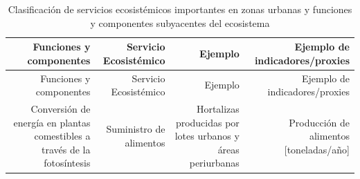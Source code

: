 \documentclass[12pt,]{book}
\begin{document}
\begin{longtable}[]{@{}rrrr@{}}
\caption{\label{tab:clasf-SerAm} Clasificación de servicios ecosistémicos
importantes en zonas urbanas y funciones y componentes subyacentes del
ecosistema}\tabularnewline
\toprule
\begin{minipage}[b]{0.26\columnwidth}\raggedleft\strut
Funciones y componentes\strut
\end{minipage} & \begin{minipage}[b]{0.22\columnwidth}\raggedleft\strut
Servicio Ecosistémico\strut
\end{minipage} & \begin{minipage}[b]{0.19\columnwidth}\raggedleft\strut
Ejemplo\strut
\end{minipage} & \begin{minipage}[b]{0.22\columnwidth}\raggedleft\strut
Ejemplo de indicadores/proxies\strut
\end{minipage}\tabularnewline
\midrule
\endfirsthead
\toprule
\begin{minipage}[b]{0.26\columnwidth}\raggedleft\strut
Funciones y componentes\strut
\end{minipage} & \begin{minipage}[b]{0.22\columnwidth}\raggedleft\strut
Servicio Ecosistémico\strut
\end{minipage} & \begin{minipage}[b]{0.19\columnwidth}\raggedleft\strut
Ejemplo\strut
\end{minipage} & \begin{minipage}[b]{0.22\columnwidth}\raggedleft\strut
Ejemplo de indicadores/proxies\strut
\end{minipage}\tabularnewline
\midrule
\endhead
\begin{minipage}[t]{0.26\columnwidth}\raggedleft\strut
Conversión de energía en plantas comestibles a través de la
fotosíntesis\strut
\end{minipage} & \begin{minipage}[t]{0.22\columnwidth}\raggedleft\strut
Suministro de alimentos\strut
\end{minipage} & \begin{minipage}[t]{0.19\columnwidth}\raggedleft\strut
Hortalizas producidas por lotes urbanos y áreas periurbanas\strut
\end{minipage} & \begin{minipage}[t]{0.22\columnwidth}\raggedleft\strut
Producción de alimentos {[}toneladas/año{]}\strut
\end{minipage}\tabularnewline

\end{longtable}
\end{document}
